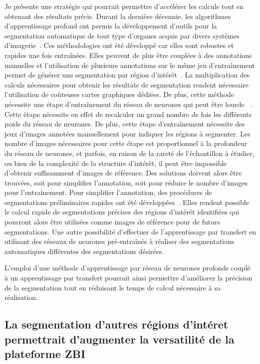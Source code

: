 \documentclass[\main/main.tex]{subfiles}
\begin{document}
Je présente une stratégie qui pourrait permettre d'accélérer les calculs tout en obtenant des résultats précis.
%
Durant la dernière décennie, les algorithmes d'apprentissage profond ont permis la développement d'outils pour la segmentation automatique de tout type d'organes acquis par divers systèmes d'imagerie~\cite{gottapu_2018,oztel_2017,zhang_2020,hossain_2019}.
%
Ces méthodologies ont été développé car elles sont robustes et rapides une fois entraînées. Elles peuvent de plus être couplées à des annotations manuelles et l'utilisation de plusieurs annotations sur le même jeu d'entraînement permet de générer une segmentation par région d'intérêt~\cite{zhao_2019,tong_2018,feng_2019}.
%
La multiplication des calculs nécessaires pour obtenir les résultats de segmentation rendent nécessaire l'utilisation de coûteuses cartes graphiques dédiées.
%
De plus, cette méthode nécessite une étape d'entraînement du réseau de neurones qui peut être lourde ~\cite{ghafoorian_2017,jiang_2018,xu_2018}.
%
Cette étape nécessite en effet de recalculer un grand nombre de fois les différents poids du réseau de neurones. De plus, cette étape d'entraînement nécessite des jeux d'images annotées manuellement pour indiquer les régions à segmenter. 
%
Les nombre d'images nécessaires pour cette étape est proportionnel à la profondeur du réseau de neurones, et parfois, en raison de la rareté de l'échantillon à étudier, ou bien de la complexité de la structure d'intérêt, il peut être impossible d'obtenir suffisamment d'images de référence. Des solutions doivent alors être trouvées, soit pour simplifier l'annotation, soit pour réduire le nombre d'images pour l'entraînement.
%
Pour simplifier l'annotation, des procédures de segmentations préliminaires rapides ont été développées~\cite{rajchl_2017}. Elles rendent possible le calcul rapide de segmentations précises des régions d'intérêt identifiées qui pourront alors être utilisées comme images de référence pour de futurs segmentations.
%
Une autre possibilité  d'effectuer de l'apprentissage par transfert en utilisant des réseaux de neurones pré-entraînés à réaliser des segmentations automatiques différentes des segmentations désirées.

L'emploi d'une méthode d'apprentissage par réseau de neurones profonds couplé à un apprentissage par transfert pourrait ainsi permettre d'améliorer la précision de la segmentation tout en réduisant le temps de calcul nécessaire à sa réalisation.

    \subsection{La segmentation d'autres régions d'intéret permettrait d'augmenter la versatilité de la plateforme ZBI}
 
\end{document}
